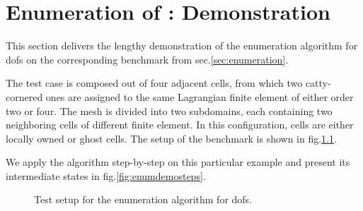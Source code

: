 \chapter{Enumeration of : Demonstration}
\label{app::enumeration}

This section delivers the lengthy demonstration of the enumeration algorithm for \glspl{dof} on the corresponding benchmark from sec.\@ \ref{sec:enumeration}.

The test case is composed out of four adjacent cells, from which two catty-cornered ones are assigned to the same Lagrangian finite element of either order two or four. The mesh is divided into two subdomains, each containing two neighboring cells of different finite element. In this configuration, cells are either locally owned or ghost cells. The setup of the benchmark is shown in fig.\@ \ref{fig:enumdemosetup}.

We apply the algorithm step-by-step on this particular example and present its intermediate states in fig.\@ \ref{fig:enumdemosteps}.

\begin{figure}
  \centering
  \caption{Test setup for the enumeration algorithm for \glspl{dof}.}
  \label{fig:enumdemosetup}
\end{figure}


